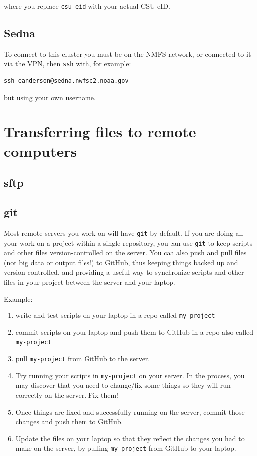 \documentclass[]{krantz}
\providecommand{\tightlist}{%
  \setlength{\itemsep}{0pt}\setlength{\parskip}{0pt}}
\begin{document}
where you replace \texttt{csu\_eid} with your actual CSU eID.

\hypertarget{sedna}{%
\subsection{Sedna}\label{sedna}}

To connect to this cluster you must be on the NMFS network, or
connected to it via the VPN, then \texttt{ssh} with, for example:

\begin{verbatim}
ssh eanderson@sedna.nwfsc2.noaa.gov
\end{verbatim}

but using your own username.

\hypertarget{transferring-files-to-remote-computers}{%
\section{Transferring files to remote computers}\label{transferring-files-to-remote-computers}}

\hypertarget{sftp}{%
\subsection{sftp}\label{sftp}}

\hypertarget{git}{%
\subsection{git}\label{git}}

Most remote servers you work on will have \texttt{git} by default.
If you are doing all your work on a project within a single
repository, you can use \texttt{git} to keep scripts and other files
version-controlled on the server. You can also push and pull files
(not big data or output files!) to GitHub, thus keeping things backed up
and version controlled, and providing a useful way to synchronize scripts
and other files in your project between the server and your laptop.

Example:

\begin{enumerate}
\def\labelenumi{\arabic{enumi}.}
\tightlist
\item
  write and test scripts on your laptop in a repo called \texttt{my-project}
\item
  commit scripts on your laptop and push them to GitHub in a repo also
  called \texttt{my-project}
\item
  pull \texttt{my-project} from GitHub to the server.
\item
  Try running your scripts in \texttt{my-project} on your server. In the process,
  you may discover that you need to change/fix some things so they will
  run correctly on the server. Fix them!
\item
  Once things are fixed and successfully running on the server, commit
  those changes and push them to GitHub.
\item
  Update the files on your laptop so that they reflect the changes you
  had to make on the server, by pulling \texttt{my-project} from GitHub to your
  laptop.
\end{enumerate}
\end{document}

